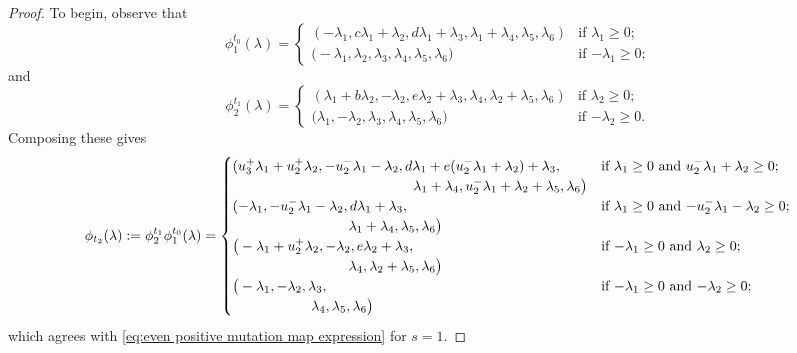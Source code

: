 \documentclass{amsart}
\numberwithin{theorem}{section}
\begin{document}
  \begin{proof}
    To begin, observe that
    \[
      \phi^{t_0}_1(\lambda)
      =
      \begin{cases} 
        (-\lambda_1,c\lambda_1+\lambda_2,d\lambda_1+\lambda_3,\lambda_1+\lambda_4,\lambda_5,\lambda_6) & \text{if $\lambda_1 \ge 0$;}\\
        \big(-\lambda_1,\lambda_2,\lambda_3,\lambda_4,\lambda_5,\lambda_6\big) & \text{if $-\lambda_1 \ge 0$;}
      \end{cases}
    \]
    and
    \[
      \phi^{t_1}_2(\lambda)
      =
      \begin{cases} 
        (\lambda_1+b\lambda_2,-\lambda_2,e\lambda_2+\lambda_3,\lambda_4,\lambda_2+\lambda_5,\lambda_6) & \text{if $\lambda_2 \ge 0$;}\\
        \big(\lambda_1,-\lambda_2,\lambda_3,\lambda_4,\lambda_5,\lambda_6\big) & \text{if $-\lambda_2 \ge 0$.}
      \end{cases}
    \]
    Composing these gives
    \[
      \phi_{t_2}(\lambda):=\phi^{t_1}_2\phi^{t_0}_1(\lambda)
      =
      \begin{cases} 
        (u_3^+\lambda_1+u_2^+\lambda_2,-u_2^-\lambda_1-\lambda_2,d\lambda_1+e(u_2^-\lambda_1+\lambda_2)+\lambda_3, & \text{if $\lambda_1 \ge 0$ and $u_2^-\lambda_1+\lambda_2 \ge 0$;}\\
        \hspace{1.79in} \lambda_1+\lambda_4,u_2^-\lambda_1+\lambda_2+\lambda_5,\lambda_6\big) & \\
        (-\lambda_1,-u_2^-\lambda_1-\lambda_2,d\lambda_1+\lambda_3, & \text{if $\lambda_1 \ge 0$ and $-u_2^-\lambda_1-\lambda_2 \ge 0$;}\\
        \hspace{1.15in} \lambda_1+\lambda_4,\lambda_5,\lambda_6\big) & \\
        \big(-\lambda_1+u_2^+\lambda_2,-\lambda_2,e\lambda_2+\lambda_3, & \text{if $-\lambda_1 \ge 0$ and $\lambda_2 \ge 0$;}\\
        \hspace{1.15in} \lambda_4,\lambda_2+\lambda_5,\lambda_6\big) & \\ 
        \big(-\lambda_1,-\lambda_2,\lambda_3, & \text{if $-\lambda_1 \ge 0$ and $-\lambda_2 \ge 0$;}\\
        \hspace{0.78in} \lambda_4,\lambda_5,\lambda_6\big) & 
      \end{cases}
    \]
    which agrees with \eqref{eq:even positive mutation map expression} for $s=1$.


\end{proof}
\end{document}
